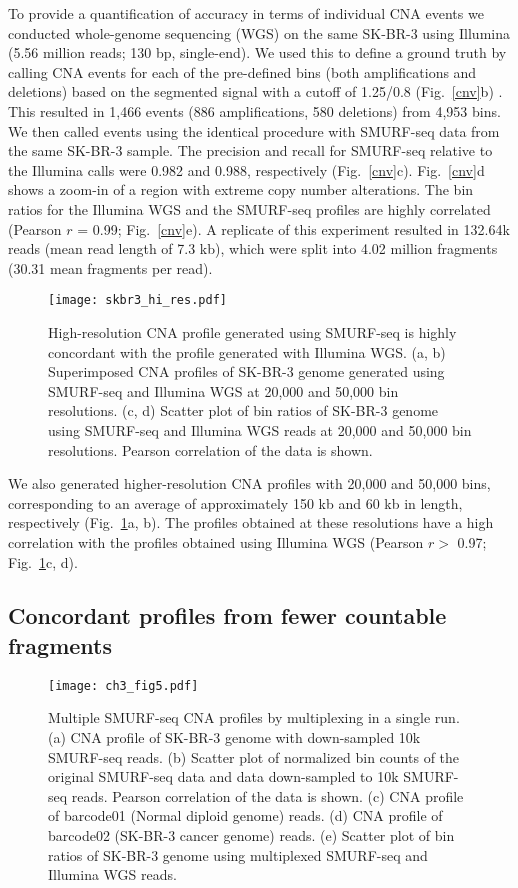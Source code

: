To provide a quantification of accuracy in terms of individual CNA
events we conducted whole-genome sequencing (WGS) on the same SK-BR-3
using Illumina (5.56 million reads; 130 bp, single-end).  We used this
to define a ground truth by calling CNA events for each of the
pre-defined bins (both amplifications and deletions) based on the
segmented signal with a cutoff of 1.25/0.8 (Fig.~\ref{cnv}b)
\citep{dago2014rapid,berry2017potential}. This resulted in 1,466 events
(886 amplifications, 580 deletions) from 4,953 bins. We then called
events using the identical procedure with SMURF-seq data from the same
SK-BR-3 sample. The precision and recall for SMURF-seq relative to the
Illumina calls were 0.982 and 0.988, respectively (Fig.~\ref{cnv}c).
Fig.~\ref{cnv}d shows a zoom-in of a region with extreme copy number
alterations. The bin ratios for the Illumina WGS and the SMURF-seq
profiles are highly correlated (Pearson $r$ = 0.99; Fig.~\ref{cnv}e).
A replicate of this experiment resulted in 132.64k reads (mean read
length of 7.3 kb), which were split into 4.02 million fragments (30.31
mean fragments per read).

\begin{figure}[t!]
\centering
\texttt{[image: skbr3\_hi\_res.pdf]}
\caption[High-resolution CNA profile with SMURF-seq]{
  High-resolution CNA profile generated using SMURF-seq is highly concordant
  with the profile generated with Illumina WGS.
  (a, b) Superimposed CNA profiles of SK-BR-3 genome generated using SMURF-seq
  and Illumina WGS at 20,000 and 50,000 bin resolutions.
  (c, d) Scatter plot of bin ratios of SK-BR-3 genome using
  SMURF-seq and Illumina WGS reads at 20,000 and 50,000 bin resolutions.
  Pearson correlation of the data is shown.}
  \label{skbr3_hi_res}
\end{figure}

We also generated higher-resolution CNA profiles with 20,000 and 50,000
bins, corresponding to an average of approximately 150 kb and 60 kb in
length, respectively (Fig.~\ref{skbr3_hi_res}a, b). The profiles obtained
at these resolutions have a high correlation with the profiles obtained
using Illumina WGS (Pearson $r>$ 0.97; Fig.~\ref{skbr3_hi_res}c, d).

\subsection{Concordant profiles from fewer countable fragments}
\begin{figure}[t!]
\centering
\texttt{[image: ch3\_fig5.pdf]}
\caption[Multiple SMURF-seq CNA profiles by multiplexing in a single run]{
  Multiple SMURF-seq CNA profiles by multiplexing in a single run.
  (a) CNA profile of SK-BR-3 genome with down-sampled 10k SMURF-seq reads.
  (b) Scatter plot of normalized bin counts of the original SMURF-seq
  data and data down-sampled to 10k SMURF-seq reads. Pearson
  correlation of the data is shown.
  (c) CNA profile of barcode01 (Normal diploid genome) reads.
  (d) CNA profile of barcode02 (SK-BR-3 cancer genome) reads.
  (e) Scatter plot of bin ratios of SK-BR-3 genome using
  multiplexed SMURF-seq and Illumina WGS reads.}
\label{cnv_mux}
\end{figure}

